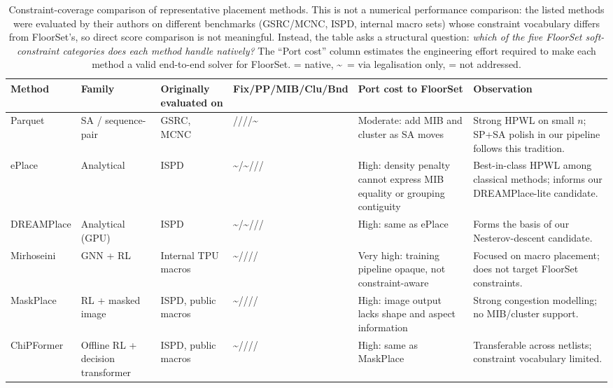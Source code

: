 \documentclass[nolineno]{ieeeaccess}
\begin{document}
\begin{table}[t]
\caption{Constraint-coverage comparison of representative placement
methods. This is not a numerical performance comparison: the listed
methods were evaluated by their authors on different benchmarks
(GSRC/MCNC, ISPD, internal macro sets) whose constraint vocabulary
differs from FloorSet's, so direct score comparison is not meaningful.
Instead, the table asks a structural question: \emph{which of the
five FloorSet soft-constraint categories does each method handle
natively?} The ``Port cost'' column estimates the engineering effort
required to make each method a valid end-to-end solver for FloorSet.
 = native, \textasciitilde\ = via legalisation only,  = not addressed.}
\label{tab:related-compare}
\centering
\footnotesize
\setlength{\tabcolsep}{3pt}
\begin{tabularx}{\textwidth}{L{2.2cm}L{2.0cm}L{2.6cm}L{1.5cm}L{1.9cm}Y}
\toprule
\textbf{Method} & \textbf{Family} & \textbf{Originally evaluated on} & \textbf{Fix/PP/MIB/Clu/Bnd} & \textbf{Port cost to FloorSet} & \textbf{Observation} \\
\midrule
Parquet \cite{parquet2008} & SA / sequence-pair & GSRC, MCNC & ////\textasciitilde & Moderate: add MIB and cluster as SA moves & Strong HPWL on small $n$; SP+SA polish in our pipeline follows this tradition.\\
ePlace \cite{lu2015eplace} & Analytical & ISPD & \textasciitilde/\textasciitilde/// & High: density penalty cannot express MIB equality or grouping contiguity & Best-in-class HPWL among classical methods; informs our DREAMPlace-lite candidate.\\
DREAMPlace \cite{lin2019dreamplace} & Analytical (GPU) & ISPD & \textasciitilde/\textasciitilde/// & High: same as ePlace & Forms the basis of our Nesterov-descent candidate.\\
Mirhoseini \cite{mirhoseini2021graph} & GNN + RL & Internal TPU macros & \textasciitilde//// & Very high: training pipeline opaque, not constraint-aware & Focused on macro placement; does not target FloorSet constraints.\\
MaskPlace \cite{lai2022maskplace} & RL + masked image & ISPD, public macros & \textasciitilde//// & High: image output lacks shape and aspect information & Strong congestion modelling; no MIB/cluster support.\\
ChiPFormer \cite{lai2023chipformer} & Offline RL + decision transformer & ISPD, public macros & \textasciitilde//// & High: same as MaskPlace & Transferable across netlists; constraint vocabulary limited.\\

\end{tabularx}
\end{table}
\end{document}
